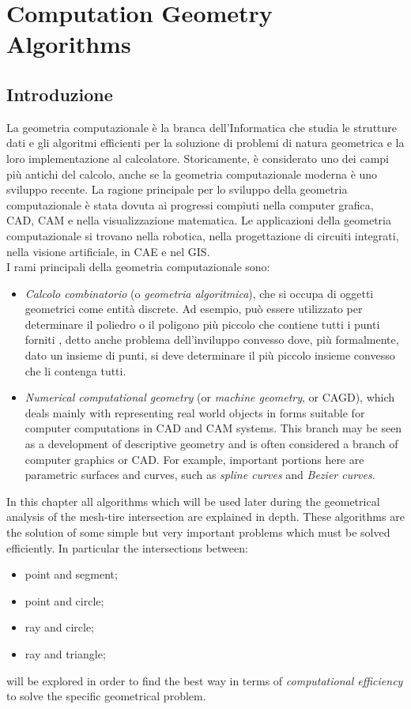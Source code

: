 \chapter{Computation Geometry Algorithms}
\label{Geom_Algos}
%
\section{Introduzione}
La geometria computazionale è la branca dell'Informatica che studia le strutture dati e gli algoritmi efficienti per la soluzione di problemi di natura geometrica e la loro implementazione al calcolatore. Storicamente, è considerato uno dei campi più antichi del calcolo, anche se la geometria computazionale moderna è uno sviluppo recente. La ragione principale per lo sviluppo della geometria computazionale è stata dovuta ai progressi compiuti nella computer grafica, \ac{CAD}, \ac{CAM} e nella visualizzazione matematica. Le applicazioni della geometria computazionale si trovano nella robotica, nella progettazione di circuiti integrati, nella visione artificiale, in \ac{CAE} e nel \ac{GIS}.\\
I rami principali della geometria computazionale sono:
\begin{itemize}
	\item \textit{Calcolo combinatorio} (o \textit{geometria algoritmica}), che si occupa di oggetti geometrici come entità discrete. Ad esempio, può essere utilizzato per determinare il poliedro o il poligono più piccolo che contiene tutti i punti forniti , detto anche problema dell'inviluppo convesso dove, più formalmente, dato un insieme di punti, si deve determinare il più piccolo insieme convesso che li contenga tutti.
	\item \textit{Numerical computational geometry} (or \textit{machine geometry}, or \ac{CAGD}), which deals mainly with representing real world objects in forms suitable for computer computations in \ac{CAD} and \ac{CAM} systems. This branch may be seen as a development of descriptive geometry and is often considered a branch of computer graphics or \ac{CAD}. For example, important portions here are parametric surfaces and curves, such as \textit{spline curves} and \textit{Bezier curves}.
\end{itemize}
In this chapter all algorithms which will be used later during the geometrical analysis of the mesh-tire intersection are explained in depth. These algorithms are the solution of some simple but very important problems which must be solved efficiently. In particular the intersections between:
\begin{itemize}
	\item point and segment;
	\item point and circle;
	\item ray and circle;
	\item ray and triangle;
\end{itemize}
will be explored in order to find the best way in terms of \textit{computational efficiency} to solve the specific geometrical problem.
%
